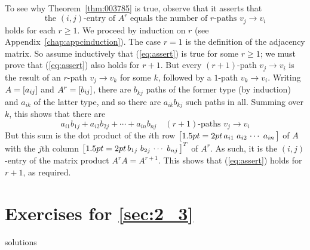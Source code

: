 To see why Theorem~\ref{thm:003785} is true, observe that it asserts that
\begin{equation} \label{eq:assert}
\mbox{the } (i, j)\mbox{-entry of } A^{r} \mbox{ equals the number of } r\mbox{-paths } v_{j} \rightarrow v_{i}
\end{equation}
holds for each $r \geq 1$. We proceed by induction on $r$ (see Appendix~\ref{chap:appcinduction}). The case $r = 1$ is the definition of the adjacency matrix. So assume inductively that (\ref{eq:assert}) is true for some $r \geq 1$; we must prove that (\ref{eq:assert}) also holds for $r + 1$. But every $(r + 1)$-path $v_{j} \to v_{i}$ is the result of an $r$-path $v_{j} \to v_{k}$ for some $k$, followed by a $1$-path $v_{k} \to v_{i}$. Writing $A = \left[ a_{ij} \right]$ and $A^{r} = \left[ b_{ij} \right]$, there are $b_{kj}$ paths of the former type (by induction) and $a_{ik}$ of the latter type, and so there are $a_{ik}b_{kj}$ such paths in all. Summing over $k$, this shows that there are
\begin{equation*}
a_{i1}b_{1j} + a_{i2}b_{2j} + \cdots + a_{in}b_{nj} \quad (r + 1)\mbox{-paths } v_{j} \rightarrow v_{i}
\end{equation*}
But this sum is the dot product of the $i$th row $\leftB \arraycolsep=2pt \begin{array}{cccc}
a_{i1} & a_{i2} & \cdots & a_{in}
\end{array} \rightB$ of $A$ with the $j$th column $\leftB \arraycolsep=2pt \begin{array}{cccc}
b_{1j} & b_{2j} & \cdots & b_{nj}
\end{array} \rightB^{T}$ of $A^{r}$. As such, it is the $(i, j)$-entry of the matrix product $A^{r}A = A^{r+1}$. This shows that (\ref{eq:assert}) holds for $r + 1$, as required.

\section*{Exercises for \ref{sec:2_3}}

\begin{Filesave}{solutions}
\end{Filesave}

